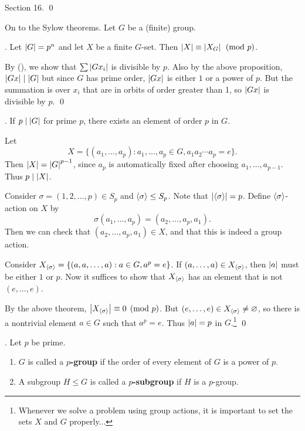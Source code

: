 \pf Section 16. \qed

\bigskip

On to the Sylow theorems. Let \(G\) be a (finite) group.

\thm. Let \(\left| G \right| = p^n\) and let \(X\) be a finite \(G\)-set. Then \(\left| X \right| \equiv \left| X_G \right| \pmod p\).

\pf By (\mast), we show that \(\sum \left| G x_i \right|\) is divisible by \(p\). Also by the above proposition, \(\left| Gx \right| \mid \left| G \right|\) but since \(G\) has prime order, \(\left| Gx \right|\) is either \(1\) or a power of \(p\). But the summation is over \(x_i\) that are in orbits of order greater than 1, so \(\left| Gx \right|\) is divisible by \(p\). \qed

\pagebreak

\thm.  If \(p \mid \left| G \right|\) for prime \(p\), there exists an element of order \(p\) in \(G\).

\pf Let
\[
    X = \{(a_1, \dots, a_p) : a_1, \dots, a_p \in G, a_1a_2\cdots a_p = e\}.
\]
Then \(\left| X \right| = \left| G \right|^{p-1}\), since \(a_p\) is automatically fixed after choosing \(a_1, \dots, a_{p-1}\). Thus \(p \mid \left| X \right|\).

Consider \(\sigma = (1, 2, \dots, p) \in S_p\) and \(\left\langle \sigma \right\rangle \leq S_p\). Note that \(\left| \left\langle \sigma \right\rangle \right| = p\). Define \(\left\langle \sigma \right\rangle\)-action on \(X\) by
\[
    \sigma(a_1, \dots, a_p) = (a_2, \dots, a_p, a_1).
\]
Then we can check that \((a_2, \dots, a_p, a_1) \in X\), and that this is indeed a group action.

Consider \(X_{\left\langle \sigma \right\rangle} = \{(a, a, \dots, a) : a \in G, a^p = e\}\). If \((a, \dots, a) \in X_{\left\langle \sigma \right\rangle}\), then \(\left| a \right|\) must be either \(1\) or \(p\). Now it suffices to show that \(X_{\left\langle \sigma \right\rangle}\) has an element that is not \((e, \dots, e)\).

By the above theorem, \(\left| X_{\left\langle \sigma \right\rangle} \right| \equiv 0 \pmod p\). But \((e, \dots, e) \in X_{\left\langle \sigma \right\rangle} \neq \varnothing\), so there is a nontrivial element \(a \in G\) such that \(a^p = e\). Thus \(\left| a \right| = p\) in \(G\).\footnote{Whenever we solve a problem using group actions, it is important to set the sets \(X\) and \(G\) properly...} \qed

.  Let \(p\) be prime.
\begin{enumerate}
    \item \(G\) is called a \textbf{\(p\)-group} if the order of every element of \(G\) is a power of \(p\).
    \item A subgroup \(H \leq G\) is called a \textbf{\(p\)-subgroup} if \(H\) is a \(p\)-group.
\end{enumerate}

